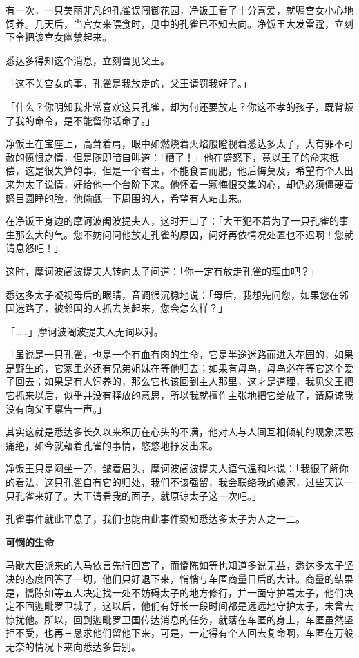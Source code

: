 \documentclass[twoside,openany]{book}
\newcommand{\mt}[1]{\textbullet \textbf{#1}}
\begin{document}
有一次，一只美丽非凡的孔雀误闯御花园，净饭王看了十分喜爱，就嘱宫女小心地饲养。几天后，当宫女来喂食时，见中的孔雀已不知去向。净饭王大发雷霆，立刻下令把该宫女幽禁起来。

悉达多得知这个消息，立刻晋见父王。

「这不关宫女的事，孔雀是我放走的，父王请罚我好了。」

「什么？你明知我非常喜欢这只孔雀，却为何还要放走？你这不孝的孩子，既背叛了我的命令，是不能留你活命了。」

净饭王在宝座上，高耸着肩，眼中如燃烧着火焰般瞪视着悉达多太子，大有罪不可赦的愤恨之情，但是随即暗自叫道：「糟了！」他在盛怒下，竟以王子的命来抵偿，这是很失算的事，但是一个君王，不能食言而肥，他后悔莫及，希望有个人出来为太子说情，好给他一个台阶下来。他怀着一颗悔恨交集的心，却仍必须僵硬着怒目圆睁的脸，他偷觑一下周围的人，希望有人站出来。

在净饭王身边的摩诃波阇波提夫人，这时开口了：「大王犯不着为了一只孔雀的事生那么大的气。您不妨问问他放走孔雀的原因，问好再依情况处置也不迟啊！您就请息怒吧！」

这时，摩诃波阇波提夫人转向太子问道：「你一定有放走孔雀的理由吧？」

悉达多太子凝视母后的眼睛，音调很沉稳地说：「母后，我想先问您，如果您在邻国迷路了，被邻国的人抓去关起来，您会怎么样？」

「……」摩诃波阇波提夫人无词以对。

「虽说是一只孔雀，也是一个有血有肉的生命，它是半途迷路而进入花园的，如果是野生的，它家里必还有兄弟姐妹在等他归去；如果有母鸟，母鸟必在等它这个爱子回去；如果是有人饲养的，那么它也该回到主人那里，这才是道理，我见父王把它抓来以后，似乎并没有释放的意思，所以我就擅作主张地把它给放了，请原谅我没有向父王禀告一声。」

其实这就是悉达多长久以来积历在心头的不满，他对人与人间互相倾轧的现象深恶痛绝，如今就藉着孔雀的事情，悠悠地抒发出来。

净饭王只是闷坐一旁，皱着眉头，摩诃波阇波提夫人语气温和地说：「我很了解你的看法，这只孔雀自有它的归处，我们不该强留，我会联络我的娘家，过些天送一只孔雀来好了。大王请看我的面子，就原谅太子这一次吧。」

孔雀事件就此平息了，我们也能由此事件窥知悉达多太子为人之一二。

\mt{可悯的生命}

马歇大臣派来的人马依言先行回宫了，而憍陈如等也知道多说无益，悉达多太子坚决的态度回答了一切，他们只好退下来，悄悄与车匿商量日后的大计。商量的结果是，憍陈如等五人决定找一处不妨碍太子的地方修行，并一面守护着太子，他们决定不回迦毗罗卫城了，这以后，他们有好长一段时间都是远远地守护太子，未曾去惊扰他。所以，回到迦毗罗卫国传达消息的任务，就落在车匿的身上，车匿虽然坚拒不受，也再三恳求他们留他下来，可是，一定得有个人回去复命啊，车匿在万般无奈的情况下来向悉达多告别。
\end{document}
